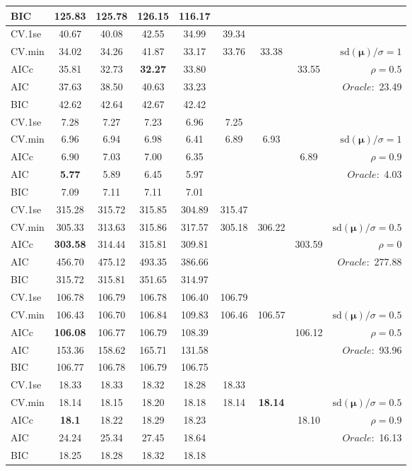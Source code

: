 \begin{table}
\begin{center}
\begin{tabular}{l*{7}{c}|r}
BIC & 125.83 & 125.78 & 126.15 & 116.17 & & & &  \\
 \hline 
CV.1se & 40.67 & 40.08 & 42.55 & 34.99 & 39.34 & & & \\
CV.min & 34.02 & 34.26 & 41.87 & 33.17 & 33.76 & 33.38 & & $\mathrm{sd}(\mathbf{\mu})/\sigma=1$ \\
AICc & 35.81 & 32.73 & {\bf 32.27} & 33.80 & & & 33.55 &  $\rho=0.5$ \\
AIC & 37.63 & 38.50 & 40.63 & 33.23 & & & &  \multirow{2}{*}{$Oracle: $ 23.49} \\
BIC & 42.62 & 42.64 & 42.67 & 42.42 & & & &  \\
 \hline 
CV.1se & 7.28 & 7.27 & 7.23 & 6.96 & 7.25 & & & \\
CV.min & 6.96 & 6.94 & 6.98 & 6.41 & 6.89 & 6.93 & & $\mathrm{sd}(\mathbf{\mu})/\sigma=1$ \\
AICc & 6.90 & 7.03 & 7.00 & 6.35 & & & 6.89 &  $\rho=0.9$ \\
AIC & {\bf 5.77} & 5.89 & 6.45 & 5.97 & & & &  \multirow{2}{*}{$Oracle: $ 4.03} \\
BIC & 7.09 & 7.11 & 7.11 & 7.01 & & & &  \\
 \hline 
CV.1se & 315.28 & 315.72 & 315.85 & 304.89 & 315.47 & & & \\
CV.min & 305.33 & 313.63 & 315.86 & 317.57 & 305.18 & 306.22 & & $\mathrm{sd}(\mathbf{\mu})/\sigma=0.5$ \\
AICc & {\bf 303.58} & 314.44 & 315.81 & 309.81 & & & 303.59 &  $\rho=0$ \\
AIC & 456.70 & 475.12 & 493.35 & 386.66 & & & &  \multirow{2}{*}{$Oracle: $ 277.88} \\
BIC & 315.72 & 315.81 & 351.65 & 314.97 & & & &  \\
 \hline 
CV.1se & 106.78 & 106.79 & 106.78 & 106.40 & 106.79 & & & \\
CV.min & 106.43 & 106.70 & 106.84 & 109.83 & 106.46 & 106.57 & & $\mathrm{sd}(\mathbf{\mu})/\sigma=0.5$ \\
AICc & {\bf 106.08} & 106.77 & 106.79 & 108.39 & & & 106.12 &  $\rho=0.5$ \\
AIC & 153.36 & 158.62 & 165.71 & 131.58 & & & &  \multirow{2}{*}{$Oracle: $ 93.96} \\
BIC & 106.77 & 106.78 & 106.79 & 106.75 & & & &  \\
 \hline 
CV.1se & 18.33 & 18.33 & 18.32 & 18.28 & 18.33 & & & \\
CV.min & 18.14 & 18.15 & 18.20 & 18.18 & 18.14 & {\bf 18.14} & & $\mathrm{sd}(\mathbf{\mu})/\sigma=0.5$ \\
AICc & {\bf 18.1} & 18.22 & 18.29 & 18.23 & & & 18.10 &  $\rho=0.9$ \\
AIC & 24.24 & 25.34 & 27.45 & 18.64 & & & &  \multirow{2}{*}{$Oracle: $ 16.13} \\
BIC & 18.25 & 18.28 & 18.32 & 18.18 & & & &  \\
 \hline 
\end{tabular}
\end{center}
\vspace{-1cm}
\end{table}




